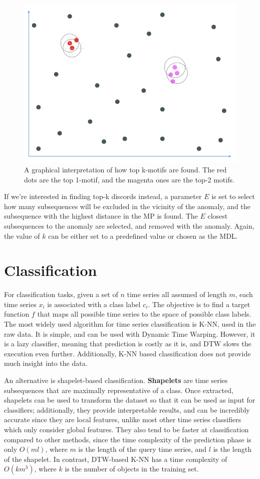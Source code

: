 \begin{figure}[ht]
    \centering
    \includegraphics[width=0.5\linewidth]{img/topk_motifs.png}
    \caption{A graphical interpretation of how top k-motifs are found. The red dots are the top 1-motif, and the magenta ones are the top-2 motifs.}
    \label{fig:top-k-motifs}
\end{figure}

If we're interested in finding top-k discords instead, a parameter $E$ is set to select how many subsequences will be excluded in the vicinity of the anomaly, and the subsequence with the highest distance in the MP is found. The $E$ closest subsequences to the anomaly are selected, and removed with the anomaly. Again, the value of $k$ can be either set to a predefined value or chosen as the MDL.

\section{Classification}

For classification tasks, given a set of $n$ time series all assumed of length $m$, each time series $x_i$ is associated with a class label $c_i$. The objective is to find a target function $f$ that maps all possible time series to the space of possible class labels. The most widely used algorithm for time series classification is K-NN, used in the raw data. It is simple, and can be used with Dynamic Time Warping. However, it is a lazy classifier, meaning that prediction is costly as it is, and DTW slows the execution even further. Additionally, K-NN based classification does not provide much insight into the data.

An alternative is shapelet-based classification. \textbf{Shapelets} are time series subsequences that are maximally representative of a class. Once extracted, shapelets can be used to transform the dataset so that it can be used as input for classifiers; additionally, they provide interpretable results, and can be incredibly accurate since they are local features, unlike most other time series classifiers which only consider global features. They also tend to be faster at classification compared to other methods, since the time complexity of the prediction phase is only $O(ml)$, where $m$ is the length of the query time series, and $l$ is the length of the shapelet. In contrast, DTW-based K-NN has a time complexity of $O(km^3)$, where $k$ is the number of objects in the training set.

